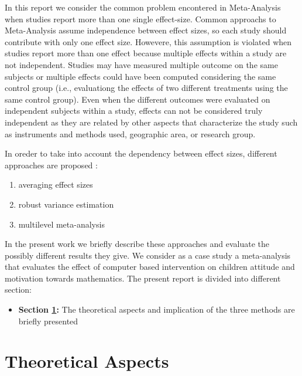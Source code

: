 \documentclass{article}\usepackage[]{graphicx}\usepackage[]{color}
\begin{document}
In this report we consider the common problem encontered in Meta-Analysis when studies report more than one single effect-size. Common approachs to Meta-Analysis assume independence between effect sizes, so each study should contribute with only one effect size. Howevere, this assumption is violated when studies report more than one effect because multiple effects within a study are not independent. Studies may have measured multiple outcome on the same subjects or multiple effects could have been computed considering the same control group (i.e., evaluationg the effects of two different treatments using the same control group). Even when the different outcomes were evaluated on independent subjects within a study, effects can not be considered truly independent as they are related by other aspects that characterize the study such as instruments and methods used, geographic area, or research group. 

In oreder to take into account the dependency between effect sizes, different approaches are proposed \parencite{pigottMethodologicalGuidancePapers2019,moeyaertMethodsDealingMultiple2017}:
\begin{enumerate}
    \item{averaging effect sizes}
    \item{robust variance estimation}
    \item{multilevel meta-analysis}
\end{enumerate}

In the present work we briefly describe these approaches and evaluate the possibly different results they give. We consider as a case study a meta-analysis that evaluates the effect of computer based intervention on children attitude and motivation towards mathematics.
The present report is divided into different section:
\begin{itemize}
    \item{\textbf{Section \ref{Theoretical_Aspects}:} The theoretical aspects and implication of the three methods are briefly presented}
\end{itemize}
\vspace{1em}
\newpage


\section{Theoretical Aspects} \label{Theoretical_Aspects}
\end{document}
